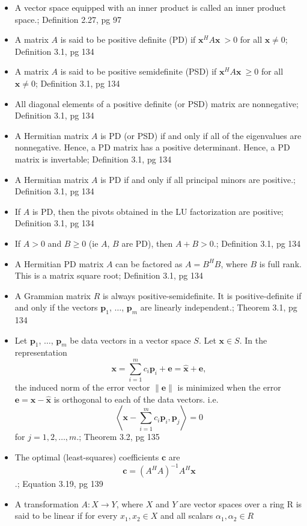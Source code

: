\documentclass{article}
\begin{document}
\begin{multicols}{2}
\begin{itemize}
\item A vector space equipped with an inner product is called an inner product space.; Definition 2.27, pg 97
\item A matrix $A$ is said to be positive definite (PD) if $\mathbf{x}^H A \mathbf{x}\ > 0$ for all $\mathbf{x} \neq 0 $; Definition 3.1, pg 134
\item A matrix $A$ is said to be positive semidefinite (PSD) if $\mathbf{x}^H A \mathbf{x}\ \geq 0$ for all $\mathbf{x} \neq 0 $; Definition 3.1, pg 134
\item All diagonal elements of a positive definite (or PSD) matrix are nonnegative; Definition 3.1, pg 134
\item A Hermitian matrix $A$ is PD (or PSD) if and only if all of the eigenvalues are nonnegative. Hence, a PD matrix has a positive determinant. Hence, a PD matrix is invertable; Definition 3.1, pg 134
\item A Hermitian matrix $A$ is PD if and only if all principal minors are positive.; Definition 3.1, pg 134
\item If $A$ is PD, then the pivots obtained in the LU factorization are positive; Definition 3.1, pg 134
\item If $A > 0$ and $B \geq 0$ (ie $A$, $B$ are PD), then $A + B  > 0  $.; Definition 3.1, pg 134
\item A Hermitian PD matrix $A$ can be factored as $A = B^H B$, where $B$ is full rank. This is a matrix square root; Definition 3.1, pg 134
\item A Grammian matrix $R$ is always positive-semidefinite. It is positive-definite if and only if the vectors $\mathbf{p}_1$, $\dots$, $\mathbf{p}_m$ are linearly independent.; Theorem 3.1, pg 134
\item Let $\mathbf{p}_1$, $\dots$, $\mathbf{p}_m$ be data vectors in a vector space $S$. Let $\mathbf{x} \in S$. In the representation $$\mathbf{x} = \sum_{i=1}^{m} c_i \mathbf{p}_i + \mathbf{e} = \hat{\mathbf{x}} + \mathbf{e},$$ the induced norm of the error vector $\| \mathbf{e} \|$ is minimized when the error $ \mathbf{e} = \mathbf{x} - \hat{\mathbf{x}} $ is orthogonal to each of the data vectors. i.e. $$ \left\langle \mathbf{x} - \sum_{i=1}^{m} c_i \mathbf{p}_i , \mathbf{p}_j \right\rangle = 0$$ for $j = 1,2,\dots, m$.; Theorem 3.2, pg 135
\item The optimal (least-squares) coefficients $\mathbf{c}$ are $$\mathbf{c} =  (A^HA)^{-1}A^H  \mathbf{x}$$.; Equation 3.19, pg 139
\item A transformation $A:X\to Y$, where $X$ and $Y$ are vector spaces over a ring R is said to be linear if for every $x_1, x_2 \in X$ and all scalars $\alpha_1, \alpha_2 \in R$ \\

\end{itemize}
\end{multicols}
\end{document}
